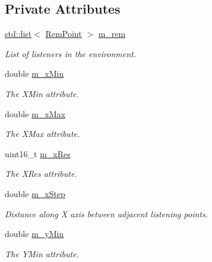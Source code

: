 \subsection*{Private Attributes}
\begin{DoxyCompactItemize}
\item 
\hyperlink{openflow-interface_8h_afd9bcfa176617760671b67580f536fa7}{std\+::list}$<$ \hyperlink{structns3_1_1RadioEnvironmentMapHelper_1_1RemPoint}{Rem\+Point} $>$ \hyperlink{classns3_1_1RadioEnvironmentMapHelper_a352fbdfaf6238d989c45ba5630a11c90}{m\+\_\+rem}
\begin{DoxyCompactList}\small\item\em List of listeners in the environment. \end{DoxyCompactList}\item 
double \hyperlink{classns3_1_1RadioEnvironmentMapHelper_ad164d05e2fb8ffebea24ea33d0fc384b}{m\+\_\+x\+Min}
\begin{DoxyCompactList}\small\item\em The {\ttfamily X\+Min} attribute. \end{DoxyCompactList}\item 
double \hyperlink{classns3_1_1RadioEnvironmentMapHelper_aa5f098561e72eacb242a5ecbb65a882f}{m\+\_\+x\+Max}
\begin{DoxyCompactList}\small\item\em The {\ttfamily X\+Max} attribute. \end{DoxyCompactList}\item 
uint16\+\_\+t \hyperlink{classns3_1_1RadioEnvironmentMapHelper_a338a6fc67e558a1870fe8815c097a680}{m\+\_\+x\+Res}
\begin{DoxyCompactList}\small\item\em The {\ttfamily X\+Res} attribute. \end{DoxyCompactList}\item 
double \hyperlink{classns3_1_1RadioEnvironmentMapHelper_ab606ef89ff7410315f9dda782b9ca678}{m\+\_\+x\+Step}
\begin{DoxyCompactList}\small\item\em Distance along X axis between adjacent listening points. \end{DoxyCompactList}\item 
double \hyperlink{classns3_1_1RadioEnvironmentMapHelper_a86310d0183abfba8d6ea5e98eeb7d166}{m\+\_\+y\+Min}
\begin{DoxyCompactList}\small\item\em The {\ttfamily Y\+Min} attribute. \end{DoxyCompactList}\item 

\end{DoxyCompactItemize}
